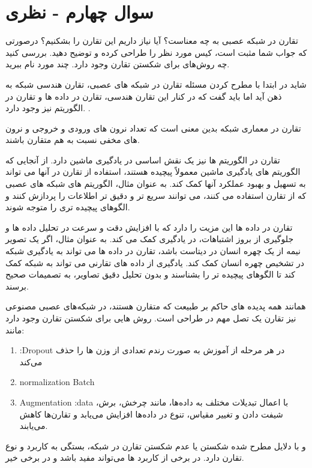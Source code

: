 \section{سوال چهارم - نظری}
تقارن در شبکه عصبی به چه معناست؟ آیا نیاز داریم این تقارن را بشکنیم؟ درصورتی که جواب شما مثبت است، کیس مورد نظر را طراحی کرده و توضیح دهید. بررسی کنید چه روش‌های برای شکستن تقارن وجود دارد. چند مورد نام ببرید.





\begin{qsolve}
 	شاید در ابتدا با مطرح کردن مسئله تقارن در شبکه های عصبی، تقارن هندسی شبکه به ذهن آید اما باید گفت که در کنار این تقارن هندسی، تقارن در داده ها و تقارن در الگوریتم نیز وجود دارد. \cite{ref1}.
 	
 	تقارن در معماری شبکه بدین معنی است که تعداد نرون های ورودی و خروجی و نرون های مخفی نسبت به هم متقارن باشند. 
 	
 	تقارن در الگوریتم ها نیز یک نقش اساسی در یادگیری ماشین دارد. از آنجایی که الگوریتم های یادگیری ماشین معمولاً پیچیده هستند، استفاده از تقارن در آنها می تواند به تسهیل و بهبود عملکرد آنها کمک کند. به عنوان مثال، الگوریتم های شبکه های عصبی که از تقارن استفاده می کنند، می توانند سریع تر و دقیق تر اطلاعات را پردازش کنند و الگوهای پیچیده تری را متوجه شوند.
 	
 	تقارن در داده ها این مزیت را دارد که با افزایش دقت و سرعت در تحلیل داده ها و جلوگیری از بروز اشتباهات، در یادگیری کمک می کند. به عنوان مثال، اگر یک تصویر نیمه از یک چهره انسان در دیتاست باشد، تقارن در داده ها می تواند به یادگیری شبکه در تشخیص چهره انسان کمک کند. یادگیری از داده های تقارنی می تواند به شبکه کمک کند تا الگوهای پیچیده تر را بشناسند و بدون تحلیل دقیق تصاویر، به تصمیمات صحیح برسند.
 	
 	
همانند همه پدیده های حاکم بر طبیعت که متقارن هستند، در شبکه‌های عصبی مصنوعی نیز تقارن یک تصل مهم در طراحی است. روش هایی برای شکستن تقارن وجود دارد مانند:

\begin{enumerate}
	\item :Dropout در هر مرحله از آموزش به صورت رندم تعدادی از وزن ها را حذف می‌کند
	
	\item normalization Batch
	
	\item Augmentation :data  با اعمال تبدیلات مختلف به داده‌ها، مانند چرخش، برش، شیفت دادن و تغییر مقیاس، تنوع در داده‌ها افزایش می‌یابد و تقارن‌ها کاهش می‌یابند.
\end{enumerate}
 و با دلایل مطرح شده شکستن یا عدم شکستن تقارن در شبکه، بستگی به کاربرد و نوع تقارن دارد. در برخی از کاربرد ها می‌تواند مفید باشد و در برخی خیر.


\end{qsolve}

















